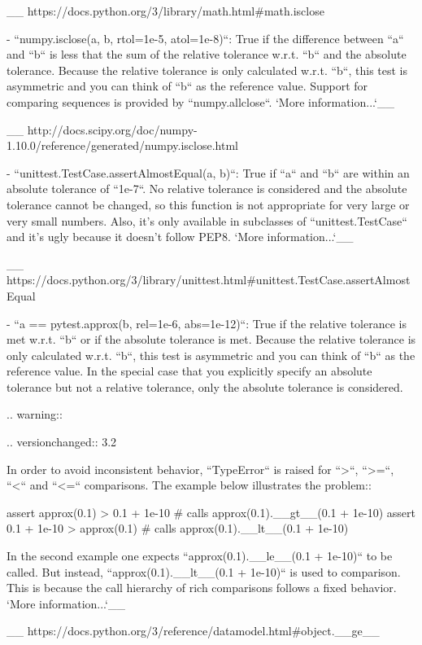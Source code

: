 \begin{DoxyVerb}
  __ https://docs.python.org/3/library/math.html#math.isclose

- ``numpy.isclose(a, b, rtol=1e-5, atol=1e-8)``: True if the difference
  between ``a`` and ``b`` is less that the sum of the relative tolerance
  w.r.t. ``b`` and the absolute tolerance.  Because the relative tolerance
  is only calculated w.r.t. ``b``, this test is asymmetric and you can
  think of ``b`` as the reference value.  Support for comparing sequences
  is provided by ``numpy.allclose``.  `More information...`__

  __ http://docs.scipy.org/doc/numpy-1.10.0/reference/generated/numpy.isclose.html

- ``unittest.TestCase.assertAlmostEqual(a, b)``: True if ``a`` and ``b``
  are within an absolute tolerance of ``1e-7``.  No relative tolerance is
  considered and the absolute tolerance cannot be changed, so this function
  is not appropriate for very large or very small numbers.  Also, it's only
  available in subclasses of ``unittest.TestCase`` and it's ugly because it
  doesn't follow PEP8.  `More information...`__

  __ https://docs.python.org/3/library/unittest.html#unittest.TestCase.assertAlmostEqual

- ``a == pytest.approx(b, rel=1e-6, abs=1e-12)``: True if the relative
  tolerance is met w.r.t. ``b`` or if the absolute tolerance is met.
  Because the relative tolerance is only calculated w.r.t. ``b``, this test
  is asymmetric and you can think of ``b`` as the reference value.  In the
  special case that you explicitly specify an absolute tolerance but not a
  relative tolerance, only the absolute tolerance is considered.

.. warning::

   .. versionchanged:: 3.2

   In order to avoid inconsistent behavior, ``TypeError`` is
   raised for ``>``, ``>=``, ``<`` and ``<=`` comparisons.
   The example below illustrates the problem::

       assert approx(0.1) > 0.1 + 1e-10  # calls approx(0.1).__gt__(0.1 + 1e-10)
       assert 0.1 + 1e-10 > approx(0.1)  # calls approx(0.1).__lt__(0.1 + 1e-10)

   In the second example one expects ``approx(0.1).__le__(0.1 + 1e-10)``
   to be called. But instead, ``approx(0.1).__lt__(0.1 + 1e-10)`` is used to
   comparison. This is because the call hierarchy of rich comparisons
   follows a fixed behavior. `More information...`__

   __ https://docs.python.org/3/reference/datamodel.html#object.__ge__
\end{DoxyVerb}
 \mbox{\label{namespace__pytest_1_1python__api_aaa3a9d5e292629d192415ffdb2843bc3}} 
